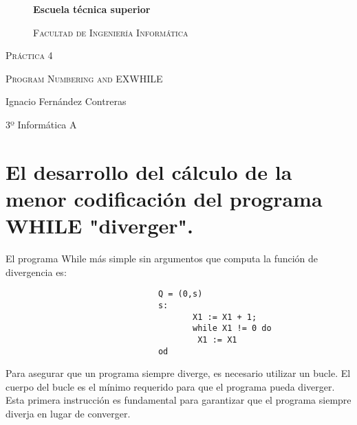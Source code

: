 \documentclass{article}
\begin{document}
\begin{titlepage}
\centering
\begin{figure}
\centering
{\bfseries\LARGE Escuela técnica superior\par}
\vspace{0.5cm}
{\scshape\Large Facultad de Ingeniería Informática\par}
\vspace{2cm}
\centering
\begin{Huge}
\begin{center}

\end{center}
\begin{Huge}

\end{Huge}
\vspace{2cm}
\end{Huge}
\end{figure}


{\scshape\Huge Práctica 4\par}
{\scshape\Large Program Numbering and EXWHILE\par}

\vspace{9cm}
{\Large Ignacio Fernández Contreras\par}
{\Large 3º Informática A\par}
\vfill

\end{titlepage}
\clearpage\hbox{}




\newpage

\section{El desarrollo del cálculo de la menor codificación del programa WHILE "diverger".}
El programa While más simple sin argumentos que computa la función de divergencia es:\\


\begin{verbatim}
                               Q = (0,s)
                               s:
                                      X1 := X1 + 1;
                                      while X1 != 0 do
                                       X1 := X1
                               od
\end{verbatim}

Para asegurar que un programa siempre diverge, es necesario utilizar un bucle. El cuerpo del bucle es el mínimo requerido para que el programa pueda diverger. Esta primera instrucción es fundamental para garantizar que el programa siempre diverja en lugar de converger.\\
\end{document}
